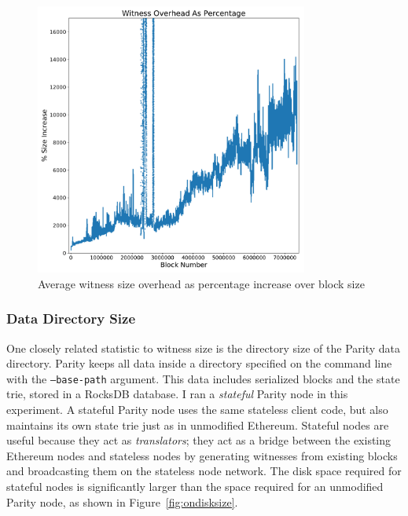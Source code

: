 \documentclass[12pt]{article}
\newcommand{\figurewidth}{0.8\textwidth}
\begin{document}
\begin{figure}[H]
  \centering
  \includegraphics[width=\figurewidth]{../figures/results/graphs/background/witness-block-size.pdf}
  \caption{Average witness size overhead as percentage increase over block size}
  \label{fig:witnesssizepct}
\end{figure}


\subsubsection{Data Directory Size}

One closely related statistic to witness size is the directory size of the Parity data directory. Parity keeps all data inside a directory specified on the command line with the \texttt{--base-path} argument. This data includes serialized blocks and the state trie, stored in a RocksDB database. I ran a \emph{stateful} Parity node in this experiment. A stateful Parity node uses the same stateless client code, but also maintains its own state trie just as in unmodified Ethereum. Stateful nodes are useful because they act as \emph{translators}; they act as a bridge between the existing Ethereum nodes and stateless nodes by generating witnesses from existing blocks and broadcasting them on the stateless node network. The disk space required for stateful nodes is significantly larger than the space required for an unmodified Parity node, as shown in Figure~\ref{fig:ondisksize}.
\end{document}
